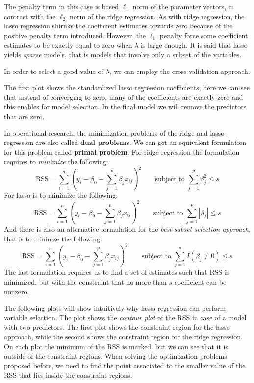 The penalty term in this case is based $\ell_1$ norm of the parameter vectors, in contrast with the $\ell_2$ norm of the ridge regression. As with ridge regression, the lasso regression shirnks the coefficient estimates towards zero because of the positive penalty term introduced. However, the $\ell_1$ penalty force some coefficient estimates to be exactly equal to zero when $\lambda$ is large enough. It is said that lasso yields \textit{sparse} models, that is models that involve only a subset of the variables.

In order to select a good value of $\lambda$, we can employ the cross-validation approach.

The first plot shows the standardized lasso regression coefficients; here we can see that instead of converging to zero, many of the coefficients are exactly zero and this enables for model selection. In the final model we will remove the predictors that are zero.

In operational research, the minimization problems of the ridge and lasso regression are also called \textbf{dual problems}. We can get an equivalent formulation for this problem called \textbf{primal problem}. For ridge regression the formulation requires to \textit{minimize} the following:
\[
    \text{RSS} = \sum_{i=1}^{n} \left(y_i - \beta_0 - \sum_{j=1}^{p} \beta_j x_{ij}\right)^2 \qquad \text{subject to } \sum_{j=1}^p \beta_j^2 \leq s
\]
For lasso is to minimize the following:
\[
    \text{RSS} = \sum_{i=1}^{n} \left(y_i - \beta_0 - \sum_{j=1}^{p} \beta_j x_{ij}\right)^2 \qquad \text{subject to } \sum_{j=1}^p |\beta_j| \leq s
\]
And there is also an alternative formulation for the \textit{best subset selection approach}, that is to minimze the following:
\[
    \text{RSS} = \sum_{i=1}^{n} \left(y_i - \beta_0 - \sum_{j=1}^{p} \beta_j x_{ij}\right)^2 \qquad \text{subject to } \sum_{j=1}^p I(\beta_j \neq 0) \leq s
\]
The last formulation requires us to find a set of estimates such that RSS is minimized, but with the constraint that no more than $s$ coefficient can be nonzero.

The following plots will show intuitively why lasso regression can perform variable selection. The plot shows the \textit{contour plot} of the RSS in case of a model with two predictors. The first plot shows the constraint region for the lasso approach, while the second shows the constraint region for the ridge regression. On each plot the minimum of the RSS is marked, but we can see that it is outside of the constraint regions. When solving the optimization problems proposed before, we need to find the point associated to the smaller value of the RSS that lies inside the constraint regions.

